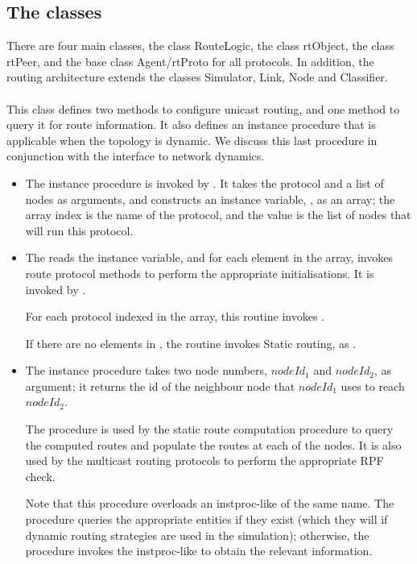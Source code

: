 \subsection{The classes}
There are four main classes,
the class RouteLogic, the class rtObject, the class rtPeer, and the
base class Agent/rtProto for all protocols.
In addition, the routing architecture extends 
the classes Simulator, Link, Node and Classifier.

\paragraph{}
This class defines two methods to configure unicast routing,
and one method to query it for route information.
It also defines an instance procedure that is applicable when
the topology is dynamic.
We discuss this last procedure in conjunction
with the interface to network dynamics.
\begin{itemize}
\item The instance procedure
is invoked by .
It takes the protocol and a list of nodes as arguments,
and constructs an instance variable, , as an array;
the array index is the name of the protocol, and the value is the list
of nodes that will run this protocol.
\item The
reads the  instance variable, and 
for each element in the array, 
invokes route protocol methods to perform the appropriate initialisations.
It is invoked by
.

For each protocol  indexed in the  array,
this routine invokes
.

If there are no elements in ,
the routine invokes Static routing, as
.

\item The instance procedure
takes two node numbers, $nodeId_1$ and $nodeId_2$, as argument;
it returns the id of the neighbour node that $nodeId_1$ uses to 
reach $nodeId_2$.

The procedure is used by the static route computation procedure to query
the computed routes and populate the routes at each of the nodes.
It is also used by the multicast routing protocols to perform the
appropriate RPF check.

Note that this procedure overloads an instproc-like of the same name.
The procedure queries the appropriate  entities
if they exist
(which they will if dynamic routing strategies are used in the simulation);
otherwise, the procedure invokes the instproc-like to obtain the relevant
information.
\end{itemize}

